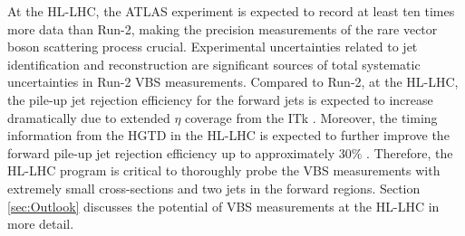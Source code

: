 At the HL-LHC, the ATLAS experiment is expected to record at least ten times more data than Run-2, making the precision measurements of the rare vector boson scattering process crucial. Experimental uncertainties related to jet identification and reconstruction are significant sources of total systematic uncertainties in Run-2 VBS measurements. Compared to Run-2, at the HL-LHC, the pile-up jet rejection efficiency for the forward jets is expected to increase dramatically due to extended $\eta$ coverage from the ITk \cite{HLLHC_JetTrack}. Moreover, the timing information from the HGTD in the HL-LHC is expected to further improve the forward pile-up jet rejection efficiency up to approximately $30\%$ \cite{HLLHC_HGTD}. Therefore, the HL-LHC program is critical to thoroughly probe the VBS measurements with extremely small cross-sections and two jets in the forward regions. Section \ref{sec:Outlook} discusses the potential of VBS measurements at the HL-LHC in more detail. 